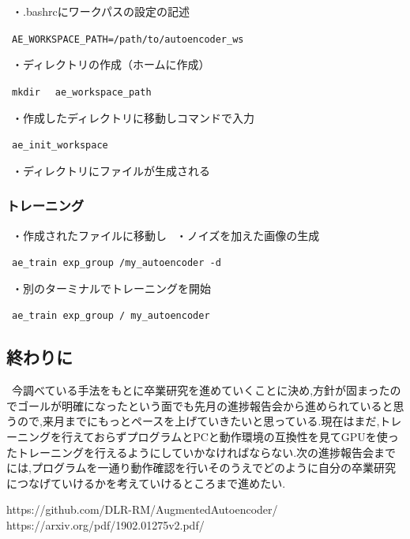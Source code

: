 \documentclass[11pt,a4j,ascmac]{jarticle}
\begin{document}
\ ・.bashrcにワークパスの設定の記述

\ \verb|AE_WORKSPACE_PATH=/path/to/autoencoder_ws|


\ ・ディレクトリの作成（ホームに作成）


\ \verb|mkdir 　ae_workspace_path|

\ ・作成したディレクトリに移動しコマンドで入力

\ \verb|ae_init_workspace|

\ ・ディレクトリにファイルが生成される



\subsubsection{トレーニング}

\ ・作成されたファイルに移動し
\ ・ノイズを加えた画像の生成

\ \verb|ae_train exp_group /my_autoencoder -d|


\ ・別のターミナルでトレーニングを開始

\ \verb|ae_train exp_group / my_autoencoder|




\subsection{終わりに}
\  今調べている手法をもとに卒業研究を進めていくことに決め,方針が固まったのでゴールが明確になったという面でも先月の進捗報告会から進められていると思うので,来月までにもっとペースを上げていきたいと思っている.現在はまだ,トレーニングを行えておらずプログラムとPCと動作環境の互換性を見てGPUを使ったトレーニングを行えるようにしていかなければならない.次の進捗報告会までには,プログラムを一通り動作確認を行いそのうえでどのように自分の卒業研究につなげていけるかを考えていけるところまで進めたい.


\footnotesize

\begin{thebibliography}{9}
https://github.com/DLR-RM/AugmentedAutoencoder/
https://arxiv.org/pdf/1902.01275v2.pdf/
                   



\end{thebibliography}



\normalsize
\end{document}
